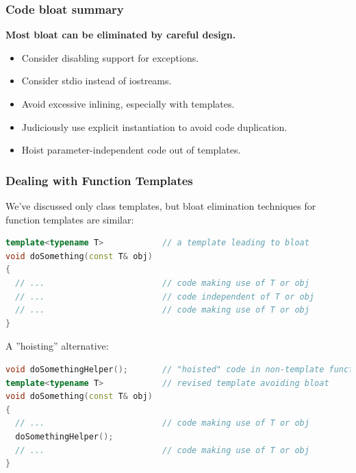\subsubsection{Code bloat summary}
\textbf{Most bloat can be eliminated by careful design.}
\begin{itemize}
  \item Consider disabling support for exceptions.
  \item Consider stdio instead of iostreams.
  \item Avoid excessive inlining, especially with templates.
  \item Judiciously use explicit instantiation to avoid code duplication.
  \item Hoist parameter-independent code out of templates.
\end{itemize}

\subsubsection{Dealing with Function Templates}
We've discussed only class templates, but bloat elimination techniques for function templates are similar:
\begin{lstlisting}[language=C++]
template<typename T>            // a template leading to bloat
void doSomething(const T& obj)
{
  // ...                        // code making use of T or obj
  // ...                        // code independent of T or obj
  // ...                        // code making use of T or obj
}
\end{lstlisting}
A ''hoisting'' alternative:
\begin{lstlisting}[language=C++]
void doSomethingHelper();       // "hoisted" code in non-template function; not inline
template<typename T>            // revised template avoiding bloat
void doSomething(const T& obj)
{
  // ...                        // code making use of T or obj
  doSomethingHelper();
  // ...                        // code making use of T or obj
}
\end{lstlisting}

